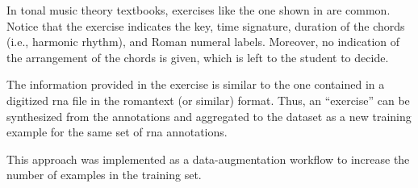
In tonal music theory textbooks, exercises like the one
shown in  are common. Notice that
the exercise indicates the key, time signature, duration of
the chords (i.e., harmonic rhythm), and Roman numeral
labels. Moreover, no indication of the arrangement of the
chords is given, which is left to the student to decide. 


The information provided in the exercise is similar to the
one contained in a digitized \gls{rna} file in the
\gls{romantext} (or similar) format. Thus, an ``exercise''
can be synthesized from the annotations and aggregated to
the dataset as a new training example for the same set of
\gls{rna} annotations.

This approach was implemented as a data-augmentation
workflow to increase the number of examples in the training
set.
